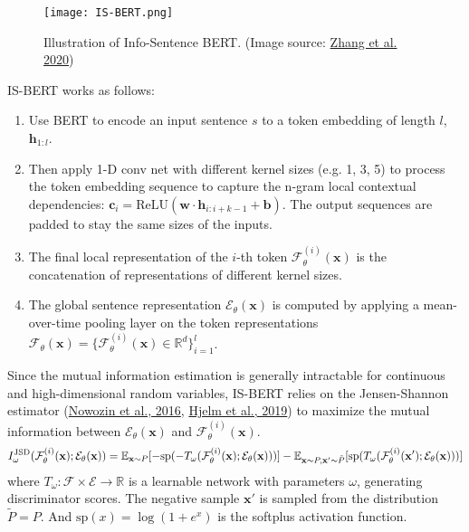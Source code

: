 \documentclass[12pt]{article}
\begin{document}
\begin{figure}[H]
    \centering
    \texttt{[image: IS-BERT.png]}
    \caption{Illustration of Info-Sentence BERT. (Image source: \href{https://arxiv.org/abs/2009.12061}{Zhang et al. 2020})}
\end{figure}

IS-BERT works as follows:
\begin{enumerate}
    \item Use BERT to encode an input sentence $s$ to a token embedding of length $l$, $\mathbf{h}_{1:l}$.
    \item Then apply 1-D conv net with different kernel sizes (e.g. 1, 3, 5) to process the token embedding sequence to capture the n-gram local contextual dependencies: $\mathbf{c}_i = \text{ReLU}(\mathbf{w} \cdot \mathbf{h}_{i:i+k-1} + \mathbf{b})$. The output sequences are padded to stay the same sizes of the inputs.
    \item The final local representation of the $i$-th token $\mathcal{F}_\theta^{(i)} (\mathbf{x})$ is the concatenation of representations of different kernel sizes.
    \item The global sentence representation $\mathcal{E}_\theta(\mathbf{x})$ is computed by applying a mean-over-time pooling layer on the token representations $\mathcal{F}_\theta(\mathbf{x}) = \{\mathcal{F}_\theta^{(i)} (\mathbf{x}) \in \mathbb{R}^d\}_{i=1}^l$.
\end{enumerate}

Since the mutual information estimation is generally intractable for continuous and high-dimensional random variables, IS-BERT relies on the Jensen-Shannon estimator (\href{https://arxiv.org/abs/1606.00709}{Nowozin et al., 2016}, \href{https://arxiv.org/abs/1808.06670}{Hjelm et al., 2019}) to maximize the mutual information between $\mathcal{E}_\theta(\mathbf{x})$ and $\mathcal{F}_\theta^{(i)} (\mathbf{x})$.
\[
I^\text{JSD}_\omega(\mathcal{F}_\theta^{(i)} (\mathbf{x}); \mathcal{E}_\theta(\mathbf{x})) = \mathbb{E}_{\mathbf{x}\sim P} [-\text{sp}(-T_\omega(\mathcal{F}_\theta^{(i)} (\mathbf{x}); \mathcal{E}_\theta(\mathbf{x})))] \\ - \mathbb{E}_{\mathbf{x}\sim P, \mathbf{x}' \sim\tilde{P}} [\text{sp}(T_\omega(\mathcal{F}_\theta^{(i)} (\mathbf{x}'); \mathcal{E}_\theta(\mathbf{x})))]
\]
where $T_\omega: \mathcal{F}\times\mathcal{E} \to \mathbb{R}$ is a learnable network with parameters $\omega$, generating discriminator scores. The negative sample $\mathbf{x}'$ is sampled from the distribution $\tilde{P}=P$. And $\text{sp}(x)=\log(1+e^x)$ is the softplus activation function.
\end{document}
